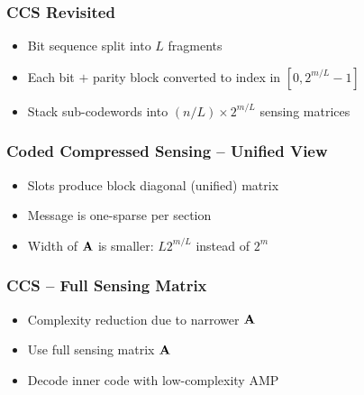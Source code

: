 
\begin{frame}
\frametitle{CCS Revisited}
\begin{center}

\end{center}
\begin{itemize}
\item Bit sequence split into $L$ fragments
\item Each bit $+$ parity block converted to index in $[ 0, 2^{m/L}-1 ]$
\item Stack sub-codewords into $(n/L) \times 2^{m/L}$ sensing matrices
\end{itemize}
\end{frame}


\begin{frame}
\frametitle{Coded Compressed Sensing -- Unified View}
\begin{center}

\end{center}
\begin{itemize}
\item Slots produce block diagonal (unified) matrix
\item Message is one-sparse per section
\item Width of $\mathbf{A}$ is smaller: $L 2^{m/L}$ instead of $2^m$
\end{itemize}
\end{frame}


\begin{frame}
\frametitle{CCS -- Full Sensing Matrix}
\begin{center}

\end{center}
\begin{itemize}
\item Complexity reduction due to narrower $\mathbf{A}$
\item Use full sensing matrix $\mathbf{A}$
\item Decode inner code with low-complexity AMP
\end{itemize}
\end{frame}



